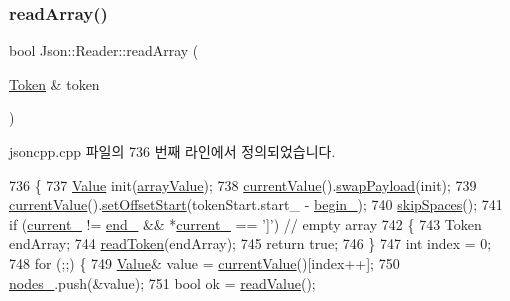\subsubsection{\texorpdfstring{read\+Array()}{readArray()}}
{\footnotesize\ttfamily bool Json\+::\+Reader\+::read\+Array (\begin{DoxyParamCaption}\item[{\hyperlink{class_json_1_1_reader_1_1_token}{Token} \&}]{token }\end{DoxyParamCaption})\hspace{0.3cm}{\ttfamily [private]}}



jsoncpp.\+cpp 파일의 736 번째 라인에서 정의되었습니다.


\begin{DoxyCode}
736                                         \{
737   \hyperlink{class_json_1_1_value}{Value} init(\hyperlink{namespace_json_a7d654b75c16a57007925868e38212b4eadc8f264f36b55b063c78126b335415f4}{arrayValue});
738   \hyperlink{class_json_1_1_reader_a85597f763fb0148a17359b6dfc6f7326}{currentValue}().\hyperlink{class_json_1_1_value_a5263476047f20e2fc6de470e4de34fe5}{swapPayload}(init);
739   \hyperlink{class_json_1_1_reader_a85597f763fb0148a17359b6dfc6f7326}{currentValue}().\hyperlink{class_json_1_1_value_a92e32ea0f4f8a15853a3cf0beac9feb9}{setOffsetStart}(tokenStart.start\_ - 
      \hyperlink{class_json_1_1_reader_a327166839022ea91f0a8290960a8af76}{begin\_});
740   \hyperlink{class_json_1_1_reader_a40d0f69d15aeb2d52ff78d794f5ab8b2}{skipSpaces}();
741   \textcolor{keywordflow}{if} (\hyperlink{class_json_1_1_reader_a2f2feb5201a26da7aa133d2f7434479b}{current\_} != \hyperlink{class_json_1_1_reader_a714793579cbf4ee7c5a7223d2c8d77c1}{end\_} && *\hyperlink{class_json_1_1_reader_a2f2feb5201a26da7aa133d2f7434479b}{current\_} == \textcolor{charliteral}{']'}) \textcolor{comment}{// empty array}
742   \{
743     Token endArray;
744     \hyperlink{class_json_1_1_reader_a7cb0631963cc0fd4ff6ed0f570976864}{readToken}(endArray);
745     \textcolor{keywordflow}{return} \textcolor{keyword}{true};
746   \}
747   \textcolor{keywordtype}{int} index = 0;
748   \textcolor{keywordflow}{for} (;;) \{
749     \hyperlink{class_json_1_1_value}{Value}& value = \hyperlink{class_json_1_1_reader_a85597f763fb0148a17359b6dfc6f7326}{currentValue}()[index++];
750     \hyperlink{class_json_1_1_reader_ada3d2c47699dad662e6d156c8c78a6ac}{nodes\_}.push(&value);
751     \textcolor{keywordtype}{bool} ok = \hyperlink{class_json_1_1_reader_a47e56844b803d41ec993a83fadf4495c}{readValue}();

\end{DoxyCode}
